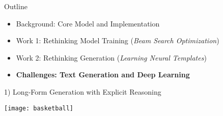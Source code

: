 \begin{frame}{Outline}

  \begin{itemize}
  \item Background: Core Model and Implementation
    \air
  \item Work 1: Rethinking Model Training (\textit{Beam Search Optimization})
    \air

  \item Work 2: Rethinking  Generation  (\textit{Learning Neural Templates})
    \air
  \item \textbf{Challenges: Text Generation and Deep Learning}
  \end{itemize}
\end{frame}





\begin{frame}{1) Long-Form Generation with Explicit Reasoning}
  \begin{center}
    \texttt{[image: basketball]}
  \end{center}
\end{frame}

